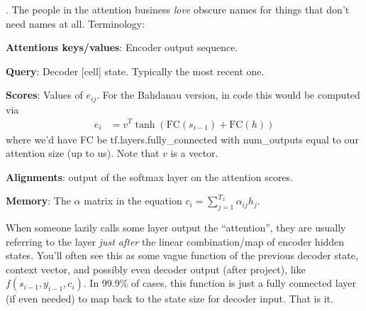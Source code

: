 \documentclass[11pt]{article}
\newcommand\myspace[1][]{\vspace{#1\bigskipamount}}
\newcommand\p{\Needspace{10\baselineskip} \noindent}
\begin{document}
\myspace
\p {}. The people in the attention business \textit{love} obscure names for things that don't need names at all. Terminology:
\begin{compactitem}
	\item \textbf{Attentions keys/values}: Encoder output sequence.
	\item \textbf{Query}: Decoder [cell] state. Typically the most recent one.
	\item \textbf{Scores}: Values of $e_{ij}$. For the Bahdanau version, in code this would be computed via
	\begin{align}
		e_i &= v^T \tanh(\text{FC}(s_{i - 1}) + \text{FC}(h))
	\end{align}
	where we'd have FC be tf.layers.fully\_connected with num\_outputs equal to our attention size (up to us). Note that $v$ is a vector.
	\item \textbf{Alignments}: output of the softmax layer on the attention scores. 
	\item \textbf{Memory}: The $\alpha$ matrix in the equation $c_i = \sum_{j = 1}^{T_x} \alpha_{ij} h_j$.
\end{compactitem}

\myspace
\p When someone lazily calls some layer output the ``attention'', they are usually referring to the layer \textit{just after} the linear combination/map of encoder hidden states. You'll often see this as some vague function of the previous decoder state, context vector, and possibly even decoder output (after project), like $f(s_{i - 1}, y_{i - 1}, c_i)$. In 99.9\% of cases, this function is just a fully connected layer (if even needed) to map back to the state size for decoder input. That is it.
\end{document}
